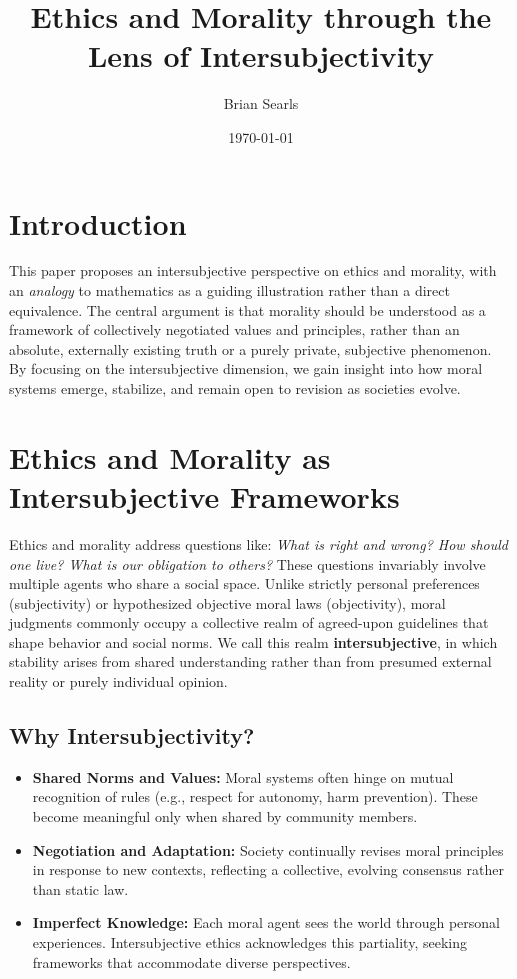 \documentclass{article}
\title{Ethics and Morality through the Lens of Intersubjectivity}
\author{Brian Searls}
\date{\today}
\begin{document}
\maketitle

\section{Introduction}

This paper proposes an intersubjective perspective on ethics and morality, with an \emph{analogy} to mathematics as a guiding illustration rather than a direct equivalence. The central argument is that morality should be understood as a framework of collectively negotiated values and principles, rather than an absolute, externally existing truth or a purely private, subjective phenomenon. By focusing on the intersubjective dimension, we gain insight into how moral systems emerge, stabilize, and remain open to revision as societies evolve.

\section{Ethics and Morality as Intersubjective Frameworks}

Ethics and morality address questions like: \emph{What is right and wrong? How should one live? What is our obligation to others?} These questions invariably involve multiple agents who share a social space. Unlike strictly personal preferences (subjectivity) or hypothesized objective moral laws (objectivity), moral judgments commonly occupy a collective realm of agreed-upon guidelines that shape behavior and social norms. We call this realm \textbf{intersubjective}, in which stability arises from shared understanding rather than from presumed external reality or purely individual opinion.

\subsection{Why Intersubjectivity?}

\begin{itemize}
  \item \textbf{Shared Norms and Values:} Moral systems often hinge on mutual recognition of rules (e.g., respect for autonomy, harm prevention). These become meaningful only when shared by community members.
  \item \textbf{Negotiation and Adaptation:} Society continually revises moral principles in response to new contexts, reflecting a collective, evolving consensus rather than static law.
  \item \textbf{Imperfect Knowledge:} Each moral agent sees the world through personal experiences. Intersubjective ethics acknowledges this partiality, seeking frameworks that accommodate diverse perspectives.
\end{itemize}
\end{document}
